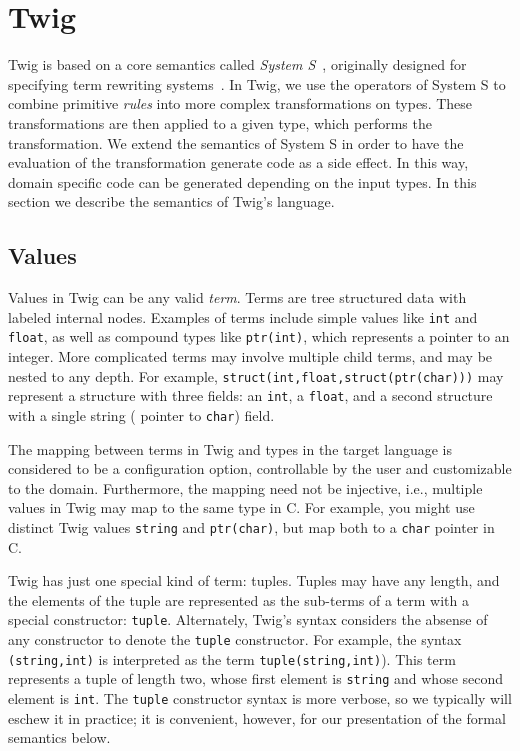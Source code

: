 
\section{Twig}
\label{sec:semantics}

Twig is based on a core semantics called \emph{System S}~\cite{system-s}, originally designed for specifying term rewriting systems~\cite{baader98rewriting}. In Twig, we use the operators of System S to combine primitive \emph{rules} into more complex transformations on types. These transformations are then applied to a given type, which performs the transformation. We extend the semantics of System S in order to have the evaluation of the transformation generate code as a side effect. In this way, domain specific code can be generated depending on the input types. In this section we describe the semantics of Twig's language.

\subsection{Values}

Values in Twig can be any valid \emph{term}. Terms are tree structured data with labeled internal nodes. Examples of terms include simple values like \texttt{int} and \texttt{float}, as well as compound types like \texttt{ptr(int)}, which represents a pointer to an integer. More complicated terms may involve multiple child terms, and may be nested to any depth. For example, \texttt{struct(int,float,struct(ptr(char)))} may represent a structure with three fields: an \texttt{int}, a \texttt{float}, and a second structure with a single string ( pointer to \texttt{char}) field.

The mapping between terms in Twig and types in the target language is considered to be a configuration option, controllable by the user and customizable to the domain. Furthermore, the mapping need not be injective, i.e., multiple values in Twig may map to the same type in C. For example, you might use distinct Twig values \texttt{string} and \texttt{ptr(char)}, but map both to a \texttt{char} pointer in C.

Twig has just one special kind of term: tuples. Tuples may have any length, and the elements of the tuple are represented as the sub-terms of a term with a special constructor: \texttt{tuple}. Alternately, Twig's syntax considers the absense of any constructor to denote the \texttt{tuple} constructor. For example, the syntax \texttt{(string,int)} is interpreted as the term \texttt{tuple(string,int)}). This term represents a tuple of length two, whose first element is \texttt{string} and whose second element is \texttt{int}. The \texttt{tuple} constructor syntax is more verbose, so we typically will eschew it in practice; it is convenient, however, for our presentation of the formal semantics below.

